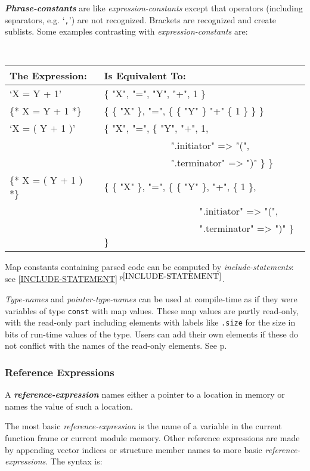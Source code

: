 \documentclass[12pt]{article}
\newcommand{\emkey}[1]{{\em \bfseries #1}}
\newcommand{\itemref}[1]{\ref{#1}$\,^{p\pageref{#1}}$}
\newcommand{\pagref}[1]{p\pageref{#1}}
\begin{document}
\emkey{Phrase-constants}\label{PHRASE-CONSTANT}
are like {\em expression-constants} except that
operators (including separators, e.g. `{\tt ,}') are not recognized.
Brackets are recognized and create sublists.  Some examples contrasting
with {\em expression-constants} are:
\begin{center} \tt
\begin{tabular}{l@{~~~}l}
\rm The Expression:	& \rm Is Equivalent To:
\\\hline
`X = Y + 1'			& \{ "X", "=", "Y", "+", 1 \}
\\[0.5ex]
\{* X = Y + 1 *\}		& \{ \{ "X" \}, "=",
                                     \{ \{ "Y" \} "+" \{ 1 \} \} \}
\\[0.5ex]
`X = ( Y + 1 )'		& \{ "X", "=", \{ "Y", "+", 1, \\
                        & ~~~~~~~~~~~~~~".initiator" => "(", \\
                        & ~~~~~~~~~~~~~~".terminator" => ")" \} \}
\\[0.5ex]
\{* X = ( Y + 1 ) *\}	& \{ \{ "X" \}, "=", \{ \{ "Y" \}, "+", \{ 1 \}, \\
                        & ~~~~~~~~~~~~~~~~~~~~".initiator" => "(", \\
                        & ~~~~~~~~~~~~~~~~~~~~".terminator" => ")" \} \}
\end{tabular}
\end{center}

Map constants containing parsed code can be computed
by {\em include-statements}: see \itemref{INCLUDE-STATEMENT}.

{\em Type-names} and {\em pointer-type-names} can be used at
compile-time as if they were variables of type {\tt const}
with map values.  These map values are partly read-only,
with the read-only part including elements with labels like
{\tt .size} for the size in bits of run-time values of the type.
Users can add their own elements if these do not conflict
with the names of the read-only elements.  See \pagref{TYPE-MAPS}.

\subsubsection{Reference Expressions}
\label{REFERENCE-EXPRESSIONS}

A \emkey{reference-expression} names either a pointer to a location in memory
or names the value of such a location.

The most basic {\em reference-expression} is the name of a variable
in the current function frame or current module memory.  Other
reference expressions are made by appending vector indices or structure
member names to more basic {\em reference-expressions}.  The syntax
is:
\end{document}
